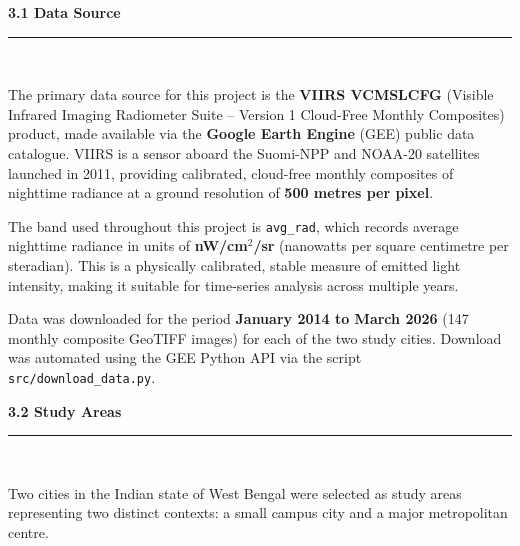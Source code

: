 \documentclass[12pt,a4paper]{report}
\begin{document}
\vspace{0.5cm}
\begin{center}
    \hypertarget{sec:s31}{}%
    {\large \textbf{3.1 Data Source}}\\[0.3cm]
    \noindent\rule{\linewidth}{0.4pt}\\[0.5cm]
\end{center}

The primary data source for this project is the \textbf{VIIRS VCMSLCFG} (Visible Infrared Imaging Radiometer Suite -- Version 1 Cloud-Free Monthly Composites) product, made available via the \textbf{Google Earth Engine} (GEE) public data catalogue. VIIRS is a sensor aboard the Suomi-NPP and NOAA-20 satellites launched in 2011, providing calibrated, cloud-free monthly composites of nighttime radiance at a ground resolution of \textbf{500 metres per pixel}.

The band used throughout this project is \texttt{avg\_rad}, which records average nighttime radiance in units of \textbf{nW/cm$^2$/sr} (nanowatts per square centimetre per steradian). This is a physically calibrated, stable measure of emitted light intensity, making it suitable for time-series analysis across multiple years.

Data was downloaded for the period \textbf{January 2014 to March 2026} (147 monthly composite GeoTIFF images) for each of the two study cities. Download was automated using the GEE Python API via the script \texttt{src/download\_data.py}.

\vspace{0.5cm}
\begin{center}
    \hypertarget{sec:s32}{}%
    {\large \textbf{3.2 Study Areas}}\\[0.3cm]
    \noindent\rule{\linewidth}{0.4pt}\\[0.5cm]
\end{center}

Two cities in the Indian state of West Bengal were selected as study areas representing two distinct contexts: a small campus city and a major metropolitan centre.
\end{document}
